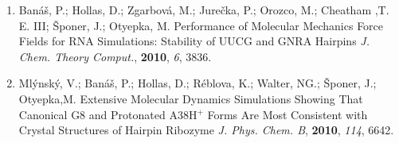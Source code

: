 \documentclass[a4paper,10pt]{article}
\begin{document}
\begin{enumerate}[(1)]
\item Banáš, P.; Hollas, D.; Zgarbová, M.; Jurečka, P.; Orozco, M.; Cheatham ,T. E. III; Šponer, J.; Otyepka, M. Performance of Molecular Mechanics Force Fields for RNA Simulations: Stability of UUCG and GNRA Hairpins \textit{J. Chem. Theory Comput.}, \textbf{2010}, \textit{6}, 3836.

\item Mlýnský, V.; Banáš, P.; Hollas, D.; Réblova, K.; Walter, NG.; Šponer, J.; Otyepka,M. Extensive Molecular Dynamics Simulations Showing That Canonical G8 and Protonated A38H$^{+}$ Forms Are Most Consistent with Crystal Structures of Hairpin Ribozyme \textit{J. Phys.  Chem. B}, \textbf{2010}, \textit{114}, 6642.

 
\end{enumerate} 
 
\end{document}
